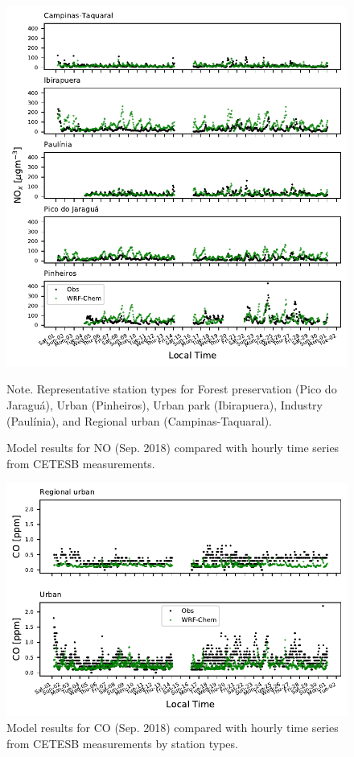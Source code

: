 \begin{figure}[hbt]
  \begin{center}
  	\includegraphics[width=.8\textwidth]{fig/Sep18_station_subplot_nox}
  \end{center}
  \caption{Model results for NO (Sep. 2018) compared with hourly time series from CETESB measurements.}
  {\scriptsize Note. Representative station types for Forest preservation (Pico do Jaraguá), Urban (Pinheiros), Urban park (Ibirapuera), Industry (Paulínia), and Regional urban (Campinas-Taquaral).}
\end{figure}

\begin{figure}[hbt]
  \centering
  \includegraphics{fig/Sep18_type_subplot_co}
  \caption{Model results for CO (Sep. 2018) compared with hourly time series from CETESB measurements by station types.}
\end{figure}

